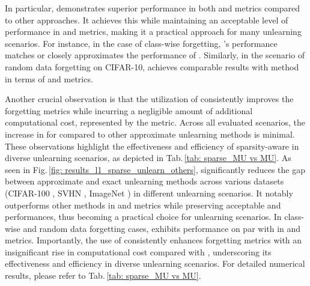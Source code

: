 In particular, {\MUSparse} demonstrates superior performance in both {\UA} and {\MIAF} metrics compared to other approaches. It achieves this while maintaining an acceptable level of performance in {\RA} and {\TA} metrics, making it a practical approach for many unlearning scenarios. For instance, in the case of class-wise forgetting, {\MUSparse}'s performance matches or closely approximates the performance of {\retrain}. Similarly, in the scenario of random data forgetting on CIFAR-10, {\MUSparse} achieves comparable results with {\retrain} method in terms of {\UA} and {\MIAF} metrics.

Another crucial observation is that the utilization of {\MUSparse} consistently improves the forgetting metrics while incurring a negligible amount of additional computational cost, represented by the {\RTE} metric. Across all evaluated scenarios, the increase in {\RTE} for {\MUSparse} compared to other approximate unlearning methods is minimal. These observations highlight the effectiveness and efficiency of sparsity-aware {\MU} in diverse unlearning scenarios, as depicted in Tab.\,\ref{tab: sparse_MU vs MU}.
\fi
As seen in Fig.\,\ref{fig: results_l1_sparse_unlearn_others},  {\MUSparse} significantly reduces the gap between approximate and exact unlearning methods across various datasets (CIFAR-100 \cite{krizhevsky2009learning}, SVHN \cite{netzer2011reading}, ImageNet \cite{deng2009imagenet}) in different unlearning scenarios. It notably outperforms other methods in {\UA} and {\MIAF} metrics while preserving acceptable {\RA} and {\TA} performances, thus becoming a practical choice for unlearning scenarios. In class-wise and random data forgetting cases, {\MUSparse} exhibits performance on par with {\retrain} in {\UA} and {\MIAF} metrics. Importantly, the use of {\MUSparse} consistently enhances forgetting metrics with an insignificant rise in computational cost compared with {\FT}, underscoring its effectiveness and efficiency in diverse unlearning scenarios. For detailed numerical results, please refer to Tab.\,\ref{tab: sparse_MU vs MU}. %



